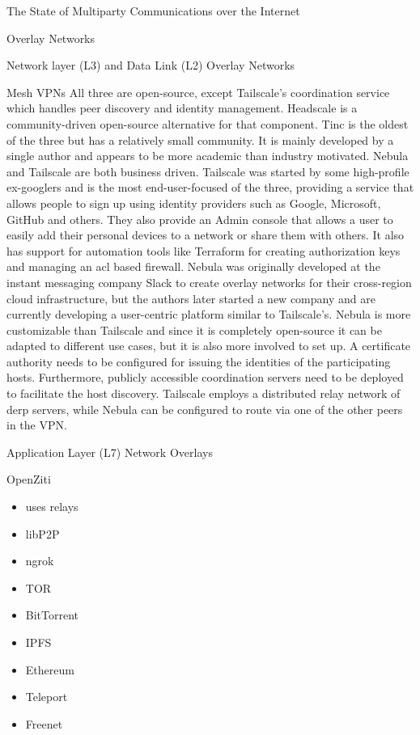 \begin{frame}[fragile]{The State of Multiparty Communications over the
Internet}
\begin{block}{Overlay Networks}
\begin{block}{Network layer (L3) and Data Link (L2) Overlay Networks}
\begin{block}{Mesh VPNs}
All three are open-source, except Tailscale's coordination service which
handles peer discovery and identity management. Headscale
\autocite{fontJuanfontHeadscale2022} is a community-driven open-source
alternative for that component. Tinc is the oldest of the three but has
a relatively small community. It is mainly developed by a single author
and appears to be more academic than industry motivated. Nebula and
Tailscale are both business driven. Tailscale was started by some
high-profile ex-googlers and is the most end-user-focused of the three,
providing a service that allows people to sign up using identity
providers such as Google, Microsoft, GitHub and others. They also
provide an Admin console that allows a user to easily add their personal
devices to a network or share them with others. It also has support for
automation tools like Terraform for creating authorization keys and
managing an \gls{acl} based firewall. Nebula was originally developed at
the instant messaging company Slack to create overlay networks for their
cross-region cloud infrastructure, but the authors later started a new
company and are currently developing a user-centric platform similar to
Tailscale's. Nebula is more customizable than Tailscale and since it is
completely open-source it can be adapted to different use cases, but it
is also more involved to set up. A certificate authority needs to be
configured for issuing the identities of the participating hosts.
Furthermore, publicly accessible coordination servers need to be
deployed to facilitate the host discovery. Tailscale employs a
distributed relay network of \gls{derp} servers, while Nebula can be
configured to route via one of the other peers in the VPN.
\end{block}
\end{block}

\begin{block}{Application Layer (L7) Network Overlays}
\protect\hypertarget{application-layer-l7-network-overlays}{}
\begin{block}{OpenZiti}
\protect\hypertarget{openziti}{}
\begin{itemize}
\item
  uses relays
\item
  libP2P
\item
  ngrok
\item
  TOR
\item
  BitTorrent
\item
  IPFS
\item
  Ethereum
\item
  Teleport
\item
  Freenet
\end{itemize}
\end{block}
\end{block}
\end{block}
\end{frame}

